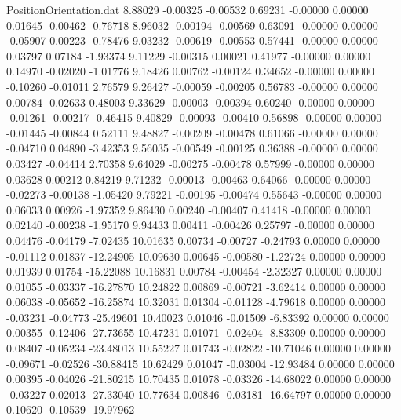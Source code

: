 \begin{filecontents}{PositionOrientation.dat}
   8.88029   -0.00325   -0.00532     0.69231   -0.00000    0.00000    0.01645   -0.00462   -0.76718
   8.96032   -0.00194   -0.00569     0.63091   -0.00000    0.00000   -0.05907    0.00223   -0.78476
   9.03232   -0.00619   -0.00553     0.57441   -0.00000    0.00000    0.03797    0.07184   -1.93374
   9.11229   -0.00315    0.00021     0.41977   -0.00000    0.00000    0.14970   -0.02020   -1.01776
   9.18426    0.00762   -0.00124     0.34652   -0.00000    0.00000   -0.10260   -0.01011    2.76579
   9.26427   -0.00059   -0.00205     0.56783   -0.00000    0.00000    0.00784   -0.02633    0.48003
   9.33629   -0.00003   -0.00394     0.60240   -0.00000    0.00000   -0.01261   -0.00217   -0.46415
   9.40829   -0.00093   -0.00410     0.56898   -0.00000    0.00000   -0.01445   -0.00844    0.52111
   9.48827   -0.00209   -0.00478     0.61066   -0.00000    0.00000   -0.04710    0.04890   -3.42353
   9.56035   -0.00549   -0.00125     0.36388   -0.00000    0.00000    0.03427   -0.04414    2.70358
   9.64029   -0.00275   -0.00478     0.57999   -0.00000    0.00000    0.03628    0.00212    0.84219
   9.71232   -0.00013   -0.00463     0.64066   -0.00000    0.00000   -0.02273   -0.00138   -1.05420
   9.79221   -0.00195   -0.00474     0.55643   -0.00000    0.00000    0.06033    0.00926   -1.97352
   9.86430    0.00240   -0.00407     0.41418   -0.00000    0.00000    0.02140   -0.00238   -1.95170
   9.94433    0.00411   -0.00426     0.25797   -0.00000    0.00000    0.04476   -0.04179   -7.02435
  10.01635    0.00734   -0.00727    -0.24793    0.00000    0.00000   -0.01112    0.01837  -12.24905
  10.09630    0.00645   -0.00580    -1.22724    0.00000    0.00000    0.01939    0.01754  -15.22088
  10.16831    0.00784   -0.00454    -2.32327    0.00000    0.00000    0.01055   -0.03337  -16.27870
  10.24822    0.00869   -0.00721    -3.62414    0.00000    0.00000    0.06038   -0.05652  -16.25874
  10.32031    0.01304   -0.01128    -4.79618    0.00000    0.00000   -0.03231   -0.04773  -25.49601
  10.40023    0.01046   -0.01509    -6.83392    0.00000    0.00000    0.00355   -0.12406  -27.73655
  10.47231    0.01071   -0.02404    -8.83309    0.00000    0.00000    0.08407   -0.05234  -23.48013
  10.55227    0.01743   -0.02822   -10.71046    0.00000    0.00000   -0.09671   -0.02526  -30.88415
  10.62429    0.01047   -0.03004   -12.93484    0.00000    0.00000    0.00395   -0.04026  -21.80215
  10.70435    0.01078   -0.03326   -14.68022    0.00000    0.00000   -0.03227    0.02013  -27.33040
  10.77634    0.00846   -0.03181   -16.64797    0.00000    0.00000    0.10620   -0.10539  -19.97962

\end{filecontents}
